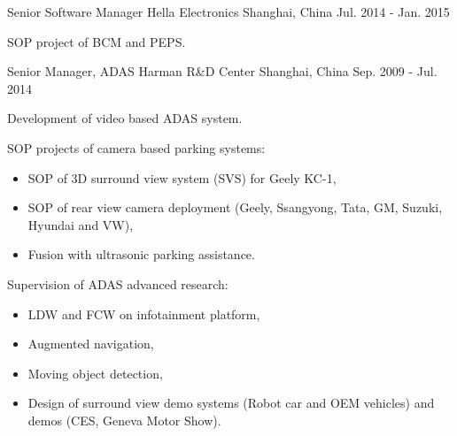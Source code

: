 \documentclass[../resume_xin.tex]{subfiles}
\begin{document}
\begin{cventries}
  \cventry
    {Senior Software Manager} %
    {Hella Electronics} %
    {Shanghai, China} %
    {Jul. 2014 - Jan. 2015} %
    {
      \begin{cvitems}
        \item SOP project of BCM and PEPS.
      \end{cvitems}
    }

  \cventry
    {Senior Manager, ADAS} %
    {Harman R\&D Center} %
    {Shanghai, China} %
    {Sep. 2009 - Jul. 2014} %
    {
      \begin{cvitems}
        \item Development of video based ADAS system.
        \item SOP projects of camera based parking systems:
          \begin{itemize}
            \item SOP of 3D surround view system (SVS) for Geely KC-1,
            \item SOP of rear view camera deployment (Geely, Ssangyong, Tata, GM, Suzuki, Hyundai and VW),
            \item Fusion with ultrasonic parking assistance.
           \end{itemize}
        \item Supervision of ADAS advanced research:
          \begin{itemize}
            \item LDW and FCW on infotainment platform,
            \item Augmented navigation,
            \item Moving object detection,
            \item Design of surround view demo systems (Robot car and OEM vehicles) and demos (CES, Geneva Motor Show).
          \end{itemize}
      \end{cvitems}
    }
\end{cventries}
\end{document}
